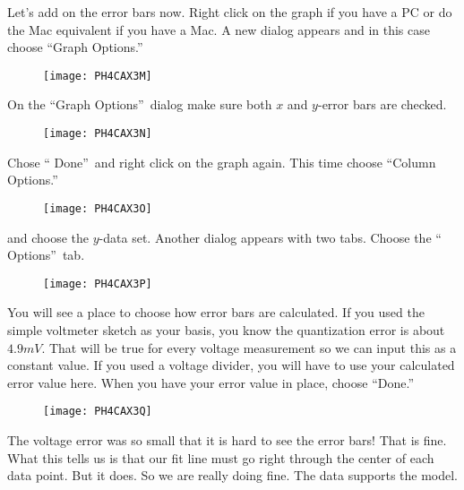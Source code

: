 Let's add on the error bars now. Right click on the graph if you have a PC
or do the Mac equivalent if you have a Mac. A new dialog appears and in this
case choose \textquotedblleft Graph Options.\textquotedblright\ \begin{figure}[h!]
\texttt{[image: PH4CAX3M]}
\end{figure}%
On the \textquotedblleft Graph Options\textquotedblright\ dialog make sure
both $x$ and $y$-error bars are checked.

\begin{figure}[h!]
\texttt{[image: PH4CAX3N]}
\end{figure}Chose \textquotedblleft
Done\textquotedblright\ and right click on the graph again. This time choose
\textquotedblleft Column Options.\textquotedblright\ \begin{figure}[h!]
\texttt{[image: PH4CAX3O]}
\end{figure}and choose the $y$-data set.
Another dialog appears with two tabs. Choose the \textquotedblleft
Options\textquotedblright\ tab. \begin{figure}[h!]
\texttt{[image: PH4CAX3P]}
\end{figure}

You will see a place to choose how error bars are calculated. If you used
the simple voltmeter sketch as your basis, you know the quantization error
is about $4.9\unit{mV}.$ That will be true for every voltage measurement so
we can input this as a constant value. If you used a voltage divider, you
will have to use your calculated error value here. When you have your error
value in place, choose \textquotedblleft Done.\textquotedblright\ \begin{figure}[h!]
\texttt{[image: PH4CAX3Q]}
\end{figure}

The voltage error was so small that it is hard to see the error bars! That
is fine. What this tells us is that our fit line must go right through the
center of each data point. But it does. So we are really doing fine. The
data supports the model.

